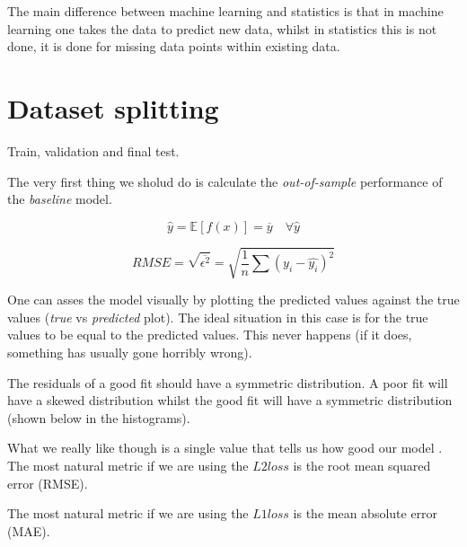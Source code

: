 \par
The main difference between machine learning and statistics is that in machine
learning one takes the data to predict new data, whilst in statistics this is
not done, it is done for missing data points within existing data.

\section{Dataset splitting}

\par
Train, validation and final test.


\par
The very first thing we sholud do is calculate the \textit{out-of-sample}
performance of the \textit{baseline} model.

$$
	\hat{y} = \mathbb{E}[f(x)] = \overline{y}\quad \forall \hat{y}
$$



$$
	RMSE = \sqrt{\overline{\epsilon^2}} =  \sqrt{\frac{1}{n}\sum(y_i - \hat{y_i})^2}
$$

\par
One can asses the model visually by plotting the predicted values against the
true values (\textit{true} vs \textit{predicted} plot). The ideal situation in
this case is for the true values to be equal to the predicted values. This never
happens (if it does, something has usually gone horribly wrong).


\par
The residuals of a good fit should have a symmetric distribution. A poor fit
will have a skewed distribution whilst the good fit will have a symmetric
distribution (shown below in the histograms).



\par
What we really like though is a single value that tells us how good our model .
The most natural metric if we are using the $L2 loss$ is the root mean squared
error (RMSE).

\par
The most natural metric if we are using the $L1 loss$ is the mean absolute error
(MAE).

